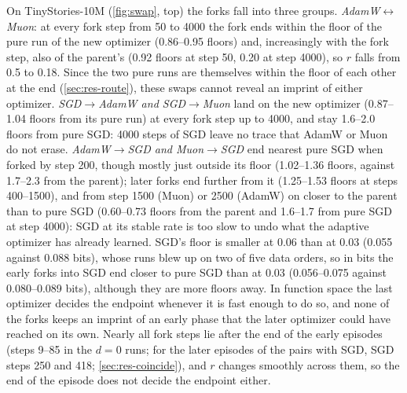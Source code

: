 \documentclass[10pt]{article}
\makeatletter
\renewcommand\paragraph{\@startsection{paragraph}{4}{\z@}{1.2ex \@plus .4ex \@minus .2ex}{-1em}{\normalfont\normalsize\bfseries}}
\makeatother
\begin{document}
\paragraph{Swaps.} On TinyStories-10M (\cref{fig:swap}, top) the forks fall into three groups.
\emph{AdamW$\leftrightarrow$Muon}: at every fork step from 50 to 4000 the fork ends within the floor of the
pure run of the new optimizer (0.86--0.95 floors) and, increasingly with the fork step, also of the parent's
(0.92 floors at step 50, 0.20 at step 4000), so $r$ falls from 0.5 to 0.18. Since the two pure runs are
themselves within the floor of each other at the end (\cref{sec:res-route}), these swaps cannot reveal an
imprint of either optimizer. \emph{SGD$\to$AdamW and SGD$\to$Muon} land on the new optimizer (0.87--1.04 floors
from its pure run) at every fork step up to 4000, and stay 1.6--2.0 floors from pure SGD: 4000 steps of SGD
leave no trace that AdamW or Muon do not erase. \emph{AdamW$\to$SGD and Muon$\to$SGD} end nearest pure SGD
when forked by step 200, though mostly just outside its floor (1.02--1.36 floors, against 1.7--2.3 from the
parent); later forks end further from it (1.25--1.53 floors at steps 400--1500), and from step 1500 (Muon) or
2500 (AdamW) on closer to the parent than to pure SGD (0.60--0.73 floors from the parent and 1.6--1.7 from pure
SGD at step 4000): SGD at its stable rate is too slow to undo what the adaptive optimizer has already learned.
SGD's floor is smaller at 0.06 than at 0.03 (0.055 against 0.088 bits), whose runs blew up on two of five
data orders, so in bits the early forks into SGD end closer to pure SGD than at 0.03 (0.056--0.075 against
0.080--0.089 bits), although they are more floors away. In function space the last optimizer decides the endpoint whenever it
is fast enough to do so, and none of the forks keeps an imprint of an early phase that the later optimizer
could have reached on its own. Nearly all fork steps lie after the end of the early episodes (steps 9--85 in the
$d=0$ runs; for the later episodes of the pairs with SGD, SGD steps 250 and 418; \cref{sec:res-coincide}), and
$r$ changes smoothly across them, so the end of the episode does not decide the endpoint either.
\end{document}
